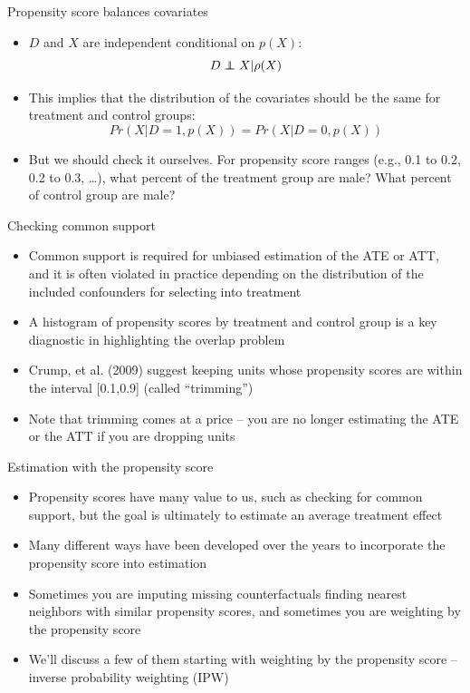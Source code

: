 \documentclass{beamer}
\newcommand\independent{\protect\mathpalette{\protect\independenT}{\perp}}
\def\independenT#1#2{\mathrel{\rlap{$#1#2$}\mkern2mu{#1#2}}}
\begin{document}
\begin{frame}{Propensity score balances covariates}
	
	\begin{itemize}
	\item  $D$ and $X$ are independent conditional on $p(X)$: $$D\independent{X} | \rho(X)$$
	\item This implies that the distribution of the covariates should be the same for treatment and control groups: $$Pr(X|D=1,p(X)) = Pr(X|D=0, p(X))$$ 
	\item But we should check it ourselves. For propensity score ranges (e.g., 0.1 to 0.2, 0.2 to 0.3, \dots), what percent of the treatment group are male? What percent of control group are male?
	\end{itemize}
\end{frame}






\begin{frame}{Checking common support}
	
	\begin{itemize}
	\item Common support is required for unbiased estimation of the ATE or ATT, and it is often violated in practice depending on the distribution of the included confounders for selecting into treatment
	\item A histogram of propensity scores by treatment and control group is a key diagnostic in highlighting the overlap problem
	\item Crump, et al. (2009) suggest keeping units whose propensity scores are within the interval [0.1,0.9] (called ``trimming'')
	\item Note that trimming comes at a price -- you are no longer estimating the ATE or the ATT if you are dropping units
	\end{itemize}
	
\end{frame}




\begin{frame}{Estimation with the propensity score}

\begin{itemize}
\item Propensity scores have many value to us, such as checking for common support, but the goal is ultimately to estimate an average treatment effect
\item Many different ways have been developed over the years to incorporate the propensity score into estimation
\item Sometimes you are imputing missing counterfactuals finding nearest neighbors with similar propensity scores, and sometimes you are weighting by the propensity score
\item We'll discuss a few of them starting with weighting by the propensity score -- inverse probability weighting (IPW)
\end{itemize}

\end{frame}
\end{document}
